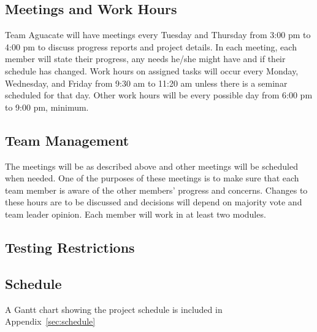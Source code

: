 
\subsection{Meetings and Work Hours}
Team Aguacate will have meetings every Tuesday and Thursday from 3:00 pm to 4:00 pm to discuss progress reports and project details.  In each meeting, each member will state their progress, any needs he/she might have and if their schedule has changed.  Work hours on assigned tasks will occur every Monday, Wednesday, and Friday from 9:30 am to 11:20 am unless there is a seminar scheduled for that day.  Other work hours will be every possible day from 6:00 pm to 9:00 pm, minimum.

\subsection{Team Management}
The meetings will be as described above and other meetings will be scheduled when needed.  One of the purposes of these meetings is to make sure that each team member is aware of the other members' progress and concerns.  Changes to these hours are to be discussed and decisions will depend on majority vote and team leader opinion.  Each member will work in at least two modules.

\subsection{Testing Restrictions}

\subsection{Schedule}
A Gantt chart showing the project schedule is included in Appendix~\ref{sec:schedule} 